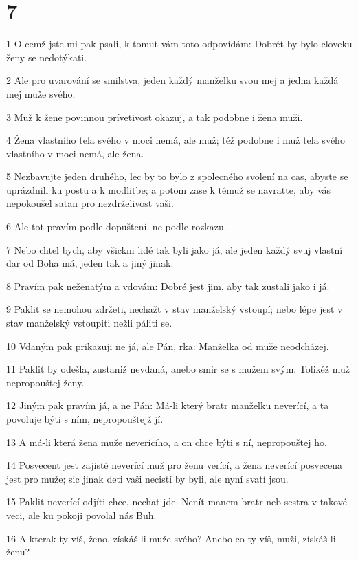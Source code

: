 \chapter{7}

\par 1 O cemž jste mi pak psali, k tomut vám toto odpovídám: Dobrét by bylo cloveku ženy se nedotýkati.
\par 2 Ale pro uvarování se smilstva, jeden každý manželku svou mej a jedna každá mej muže svého.
\par 3 Muž k žene povinnou prívetivost okazuj, a tak podobne i žena muži.
\par 4 Žena vlastního tela svého v moci nemá, ale muž; též podobne i muž tela svého vlastního v moci nemá, ale žena.
\par 5 Nezbavujte jeden druhého, lec by to bylo z spolecného svolení na cas, abyste se uprázdnili ku postu a k modlitbe; a potom zase k témuž se navratte, aby vás nepokoušel satan pro nezdrželivost vaši.
\par 6 Ale tot pravím podle dopuštení, ne podle rozkazu.
\par 7 Nebo chtel bych, aby všickni lidé tak byli jako já, ale jeden každý svuj vlastní dar od Boha má, jeden tak a jiný jinak.
\par 8 Pravím pak neženatým a vdovám: Dobré jest jim, aby tak zustali jako i já.
\par 9 Paklit se nemohou zdržeti, nechažt v stav manželský vstoupí; nebo lépe jest v stav manželský vstoupiti nežli páliti se.
\par 10 Vdaným pak prikazuji ne já, ale Pán, rka: Manželka od muže neodcházej.
\par 11 Paklit by odešla, zustaniž nevdaná, anebo smir se s mužem svým. Tolikéž muž nepropouštej ženy.
\par 12 Jiným pak pravím já, a ne Pán: Má-li který bratr manželku neverící, a ta povoluje býti s ním, nepropouštejž jí.
\par 13 A má-li která žena muže neverícího, a on chce býti s ní, nepropouštej ho.
\par 14 Posvecent jest zajisté neverící muž pro ženu verící, a žena neverící posvecena jest pro muže; sic jinak deti vaši necistí by byli, ale nyní svatí jsou.
\par 15 Paklit neverící odjíti chce, nechat jde. Nenít manem bratr neb sestra v takové veci, ale ku pokoji povolal nás Buh.
\par 16 A kterak ty víš, ženo, získáš-li muže svého? Anebo co ty víš, muži, získáš-li ženu?
